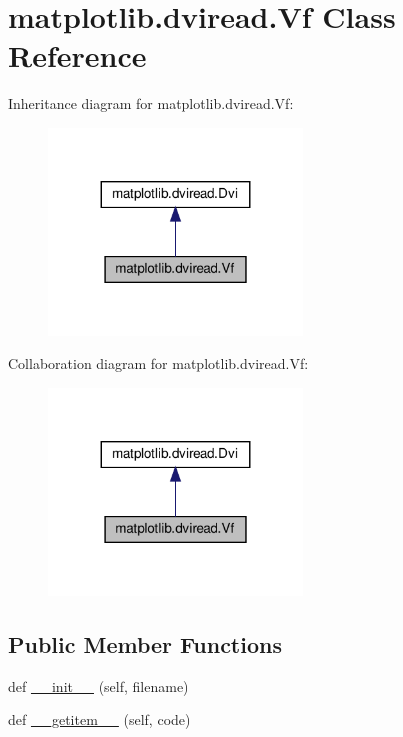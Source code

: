 \hypertarget{classmatplotlib_1_1dviread_1_1Vf}{}\section{matplotlib.\+dviread.\+Vf Class Reference}
\label{classmatplotlib_1_1dviread_1_1Vf}


Inheritance diagram for matplotlib.\+dviread.\+Vf\+:
\nopagebreak
\begin{figure}[H]
\begin{center}
\leavevmode
\includegraphics[width=191pt]{classmatplotlib_1_1dviread_1_1Vf__inherit__graph}
\end{center}
\end{figure}


Collaboration diagram for matplotlib.\+dviread.\+Vf\+:
\nopagebreak
\begin{figure}[H]
\begin{center}
\leavevmode
\includegraphics[width=191pt]{classmatplotlib_1_1dviread_1_1Vf__coll__graph}
\end{center}
\end{figure}
\subsection*{Public Member Functions}
\begin{DoxyCompactItemize}
\item 
def \hyperlink{classmatplotlib_1_1dviread_1_1Vf_aa135c97d0461624cd3000df24f10901d}{\+\_\+\+\_\+init\+\_\+\+\_\+} (self, filename)
\item 
def \hyperlink{classmatplotlib_1_1dviread_1_1Vf_abfa65df8cc5adaa05f8cfeebf000d963}{\+\_\+\+\_\+getitem\+\_\+\+\_\+} (self, code)
\end{DoxyCompactItemize}
